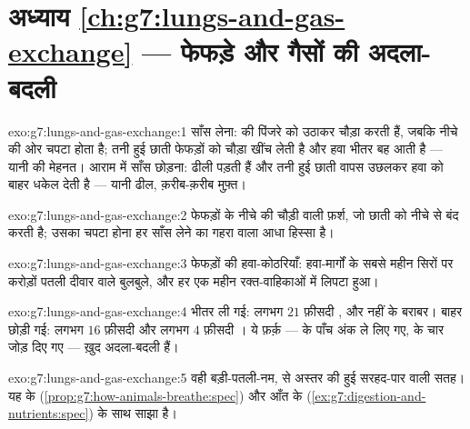 \section*{अध्याय \ref{ch:g7:lungs-and-gas-exchange} --- फेफड़े और गैसों की अदला-बदली}

\begin{solution}{exo:g7:lungs-and-gas-exchange:1}
साँस लेना:  की  पिंजरे को उठाकर चौड़ा करती हैं, जबकि
 नीचे की ओर चपटा होता है; तनी हुई छाती फेफड़ों को चौड़ा खींच लेती
है और हवा भीतर बह आती है --- यानी  की मेहनत। आराम में साँस
छोड़ना:  ढीली पड़ती हैं और तनी हुई छाती वापस उछलकर हवा को बाहर
धकेल देती है --- यानी ढील, क़रीब-क़रीब मुफ़्त।
\end{solution}

\begin{solution}{exo:g7:lungs-and-gas-exchange:2}
फेफड़ों के नीचे की चौड़ी  वाली फ़र्श, जो छाती को नीचे से बंद करती
है; उसका चपटा होना हर साँस लेने का गहरा वाला आधा हिस्सा है।
\end{solution}

\begin{solution}{exo:g7:lungs-and-gas-exchange:3}
फेफड़ों की हवा-कोठरियाँ: हवा-मार्गों के सबसे महीन सिरों पर करोड़ों
पतली दीवार वाले बुलबुले, और हर एक महीन रक्त-वाहिकाओं में लिपटा हुआ।
\end{solution}

\begin{solution}{exo:g7:lungs-and-gas-exchange:4}
भीतर ली गई: लगभग $21$ फ़ीसदी , और  नहीं के
बराबर। बाहर छोड़ी गई: लगभग $16$ फ़ीसदी  और लगभग $4$ फ़ीसदी
। ये फ़र्क़ ---  के पाँच अंक ले लिए गए,  के चार जोड़ दिए गए --- ख़ुद अदला-बदली हैं।
\end{solution}

\begin{solution}{exo:g7:lungs-and-gas-exchange:5}
वही बड़ी-पतली-नम,  से अस्तर की हुई सरहद-पार वाली सतह। यह  के
 (\cref{prop:g7:how-animals-breathe:spec}) और आँत के 
(\cref{ex:g7:digestion-and-nutrients:spec}) के साथ साझा है।
\end{solution}

